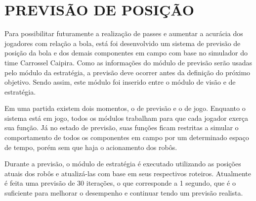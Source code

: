 \section{PREVIS{\~A}O DE POSI{\c C}{\~A}O}

Para possibilitar futuramente a realiza{\c c}{\~a}o de passes e
aumentar a acur{\'a}cia dos jogadores com rela{\c c}{\~a}o a bola, est{\'a} foi
desenvolvido um sistema de previs{\~a}o de posi{\c c}{\~a}o da bola e dos demais 
componentes em campo com base no simulador do time Carrossel Caipira.
Como as informa{\c c}{\~o}es do m{\'o}dulo de previs{\~a}o ser{\~a}o usadas pelo
módulo da estratégia, a previs{\~a}o deve ocorrer antes da defini{\c c}{\~a}o do pr{\'o}ximo objetivo. 
Sendo assim, este m{\'o}dulo foi inserido entre o módulo de visão e de estratégia.

Em uma partida existem dois momentos, o de previsão e o de jogo. Enquanto o sistema
está em jogo, todos os m{\'o}dulos trabalham para que cada jogador exer{\c c}a sua fun{\c c}{\~a}o. J{\'a} no
estado de previs{\~a}o, suas fun{\c c}{\~o}es ficam restritas a simular o comportamento de todos os
componentes em campo por um determinado espaço de tempo, porém sem que haja o acionamento dos robôs.

Durante a previs{\~a}o, o m{\'o}dulo de estrat{\'e}gia {\'e} executado utilizando as posi{\c c}{\~o}es 
atuais dos rob{\^o}s e atualiz{\'a}-las com base em seus respectivos roteiros. Atualmente {\'e} feita uma
previs{\~a}o de 30 itera{\c c}{\~o}es, o que corresponde a 1 segundo, que é o suficiente para melhorar o 
desempenho e continuar tendo um previsão realista.   
